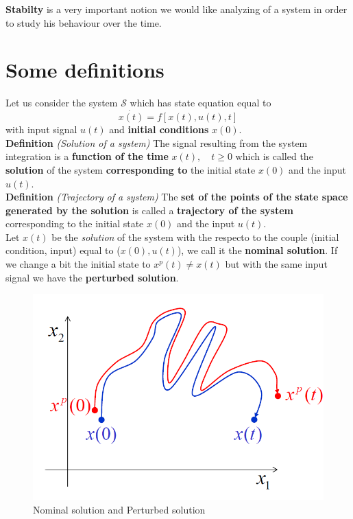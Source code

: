 
\textbf{Stabilty} is a very important notion we would like analyzing of a system in order to study his behaviour over the time.


\section{Some definitions}
Let us  consider the system $\mathcal{S}$ which has state equation equal to $$\dot{x(t)}=f[x(t), u(t),t]$$ with input signal $u(t)$ and \textbf{initial conditions} $x(0)$.\\

\noindent
\textbf{Definition} \textit{(Solution of a system)} The signal resulting from the system integration is a \textbf{function of the time} $x(t), \quad  t\ge0$ which is called the \textbf{solution} of the system {\color{blue}\textbf{corresponding to} the initial state $x(0)$ and the input $u(t)$}.\\

\noindent
\textbf{Definition} \textit{(Trajectory of a system)} The \textbf{set of the points of the state space generated by the solution} is called a \textbf{trajectory of the system} corresponding to the initial state $x(0)$ and the input $u(t)$. \\

\noindent
Let $x(t)$ be the \textit{solution} of the system with the respecto to the couple  (initial condition, input) equal to ($x(0), u(t)$), we call it the \textbf{nominal solution}. If we change a bit the initial state to $x^p(t)\ne x(t)$ but with the same input signal we have the \textbf{perturbed solution}.\\

\begin{figure}[h]
    \centering
    \includegraphics[scale=0.6]{NonLinearControl/images/NominalPerturbed.png}
    \caption{{\color{blue}Nominal solution} and {\color{red}Perturbed solution}} 
    \label{fig:enter-label}
\end{figure}

